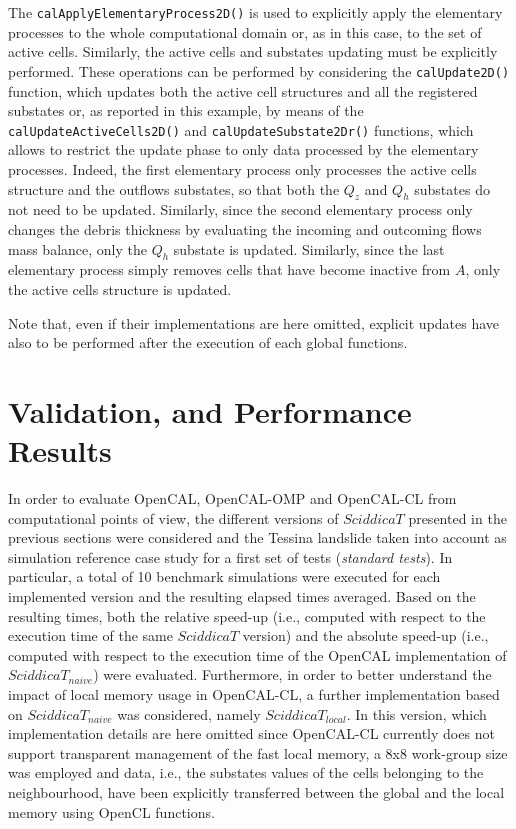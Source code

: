 \noindent The \verb'calApplyElementaryProcess2D()' is used to
explicitly apply the elementary processes to the whole
computational domain or, as in this case, to the set of active
cells. Similarly, the active cells and substates updating must be
explicitly performed. These operations can be performed by
considering the \verb'calUpdate2D()' function, which updates both
the active cell structures and all the registered substates or, as
reported in this example, by means of the
\verb'calUpdateActiveCells2D()' and \verb'calUpdateSubstate2Dr()'
functions, which allows to restrict the update phase to only data
processed by the elementary processes. Indeed, the first
elementary process only processes the active cells structure and
the outflows substates, so that both the $Q_z$ and $Q_h$ substates
do not need to be updated. Similarly, since the second elementary
process only changes the debris thickness by evaluating the
incoming and outcoming flows mass balance, only the $Q_h$ substate
is updated. Similarly, since the last elementary process simply
removes cells that have become inactive from $A$, only the active
cells structure is updated.

Note that, even if their implementations are here omitted,
explicit updates have also to be performed after the execution of
each global functions.







\section{Validation, and Performance Results}
\label{sec:computational-results}

In order to evaluate OpenCAL, OpenCAL-OMP and OpenCAL-CL from
computational points of view, the different versions of $SciddicaT$
presented in the previous sections were considered and the Tessina
landslide taken into account as simulation reference case study for
a first set of tests (\emph{standard tests}). In particular, a total
of 10 benchmark simulations were executed for each implemented
version and the resulting elapsed times averaged. Based on the
resulting times, both the relative speed-up (i.e., computed with
respect to the execution time of the same $SciddicaT$ version) and
the absolute speed-up (i.e., computed with respect to the execution
time of the OpenCAL implementation of $SciddicaT_{naive}$) were
evaluated. Furthermore, in order to better understand the impact of
local memory usage in OpenCAL-CL, a further implementation based on
$SciddicaT_{naive}$ was considered, namely $SciddicaT_{local}$. In
this version, which implementation details are here omitted since
OpenCAL-CL currently does not support transparent management of the
fast local memory, a 8x8 work-group size was employed and data,
i.e., the substates values of the cells belonging to the
neighbourhood, have been explicitly transferred between the global
and the local memory using OpenCL functions.

